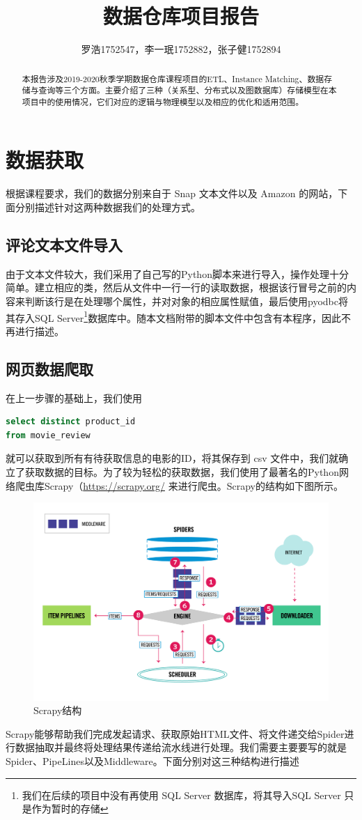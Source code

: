 \documentclass{ctexrep}
\title{\textbf{数据仓库项目报告}}
\author{罗浩1752547，李一珉1752882，张子健1752894}
\date{}
\begin{document}
	\maketitle
	\begin{abstract}
		本报告涉及2019-2020秋季学期数据仓库课程项目的ETL、Instance Matching、数据存储与查询等三个方面。主要介绍了三种（关系型、分布式以及图数据库）存储模型在本项目中的使用情况，它们对应的逻辑与物理模型以及相应的优化和适用范围。
	\end{abstract}
	\tableofcontents
	
	\chapter{数据获取}
	根据课程要求，我们的数据分别来自于 Snap 文本文件以及 Amazon 的网站，下面分别描述针对这两种数据我们的处理方式。
	\section{评论文本文件导入}
	由于文本文件较大，我们采用了自己写的Python脚本来进行导入，操作处理十分简单。建立相应的类，然后从文件中一行一行的读取数据，根据该行冒号之前的内容来判断该行是在处理哪个属性，并对对象的相应属性赋值，最后使用pyodbc将其存入SQL Server\footnote{我们在后续的项目中没有再使用 SQL Server 数据库，将其导入SQL Server 只是作为暂时的存储}数据库中。随本文档附带的脚本文件中包含有本程序，因此不再进行描述。
	\section{网页数据爬取}
	在上一步骤的基础上，我们使用 \begin{lstlisting}[language=sql]
select distinct product_id
from movie_review
	\end{lstlisting}
	就可以获取到所有有待获取信息的电影的ID，将其保存到 csv 文件中，我们就确立了获取数据的目标。为了较为轻松的获取数据，我们使用了最著名的Python网络爬虫库Scrapy（\url{https://scrapy.org/} 来进行爬虫。Scrapy的结构如下图所示。
	\begin{figure}[H]
		\centering
		\includegraphics[width=0.7\linewidth]{img/scrapy_architecture_02}
		\caption{Scrapy结构}
		\label{fig:scrapyarchitecture02}
	\end{figure}
	Scrapy能够帮助我们完成发起请求、获取原始HTML文件、将文件递交给Spider进行数据抽取并最终将处理结果传递给流水线进行处理。我们需要主要要写的就是 Spider、PipeLines以及Middleware。下面分别对这三种结构进行描述
\end{document}

